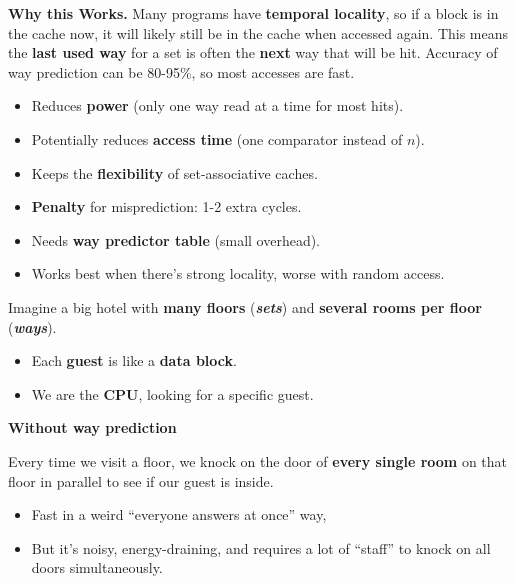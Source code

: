 \begin{itemize}
\begin{itemize}
    \end{itemize}
    \textcolor{Green3}{ \textbf{Why this Works.}} Many programs have \textbf{temporal locality}, so if a block is in the cache now, it will likely still be in the cache when accessed again. This means the \textbf{last used way} for a set is often the \textbf{next} way that will be hit. Accuracy of way prediction can be 80-95\%, so most accesses are fast.
    \begin{itemize}
        \item[\textcolor{Green3}{\faIcon{check}}] Reduces \textbf{power} (only one way read at a time for most hits).
        \item[\textcolor{Green3}{\faIcon{check}}] Potentially reduces \textbf{access time} (one comparator instead of $n$).
        \item[\textcolor{Green3}{\faIcon{check}}] Keeps the \textbf{flexibility} of set-associative caches.
        \item[\textcolor{Red2}{\faIcon{times}}] \textbf{Penalty} for misprediction: 1-2 extra cycles.
        \item[\textcolor{Red2}{\faIcon{times}}] Needs \textbf{way predictor table} (small overhead).
        \item[\textcolor{Red2}{\faIcon{times}}] Works best when there's strong locality, worse with random access.
    \end{itemize}

    \highspace
    \begin{examplebox}
        Imagine a big hotel with \textbf{many floors} (\textbf{\emph{sets}}) and \textbf{several rooms per floor} (\textbf{\emph{ways}}).
        \begin{itemize}
            \item Each \textbf{guest} is like a \textbf{data block}.
            \item We are the \textbf{CPU}, looking for a specific guest.
        \end{itemize}

        \begin{flushleft}
            \textcolor{Red2}{ \textbf{Without way prediction}}
        \end{flushleft}
        Every time we visit a floor, we knock on the door of \textbf{every single room} on that floor in parallel to see if our guest is inside.
        \begin{itemize}
            \item Fast in a weird ``everyone answers at once'' way,
            \item But it's noisy, energy-draining, and requires a lot of ``staff'' to knock on all doors simultaneously.
        \end{itemize}


\end{examplebox}
\end{itemize}

